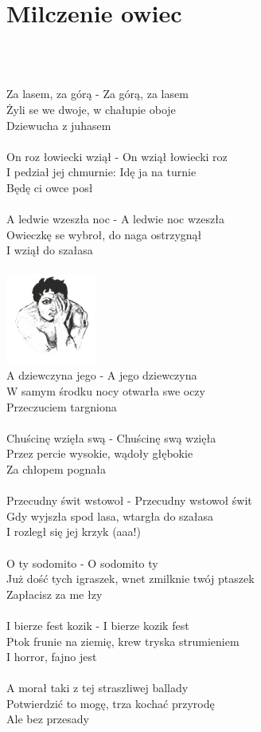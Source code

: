 \documentclass[a5paper, 10pt]{book}
\begin{document}
\newpage
\section{Milczenie owiec}\textcolor{lightgray}{\textit{}}\\~\\
\begin{minipage}[t]{0.8\textwidth}
Za lasem, za górą - Za górą, za lasem\\
Żyli se we dwoje, w chałupie oboje\\
Dziewucha z juhasem\\
\\
On roz łowiecki wziął - On wziął łowiecki roz\\
I pedział jej chmurnie: Idę ja na turnie\\
Będę ci owce posł\\
\\
A ledwie wzeszła noc - A ledwie noc wzeszła\\
Owieczkę se wybroł, do naga ostrzygnął\\
I wziął do szałasa\\
\\
\includegraphics[height=3cm, right]{images/milczenie_owiec.png}\vspace*{-3.05cm}\\
A dziewczyna jego - A jego dziewczyna\\
W samym środku nocy otwarła swe oczy\\
Przeczuciem targniona\\
\\
Chuścinę wzięła swą - Chuścinę swą wzięła\\
Przez percie wysokie, wądoły głębokie\\
Za chłopem pognała\\
\\
Przecudny świt wstowoł - Przecudny wstowoł świt\\
Gdy wyjszła spod lasa, wtargła do szałasa\\
I rozległ się jej krzyk (aaa!)\\
\\
O ty sodomito - O sodomito ty\\
Już dość tych igraszek, wnet zmilknie twój ptaszek\\
Zapłacisz za me łzy\\
\\
I bierze fest kozik - I bierze kozik fest\\
Ptok frunie na ziemię, krew tryska strumieniem\\
I horror, fajno jest\\
\\
A morał taki z tej straszliwej ballady\\
Potwierdzić to mogę, trza kochać przyrodę\\
Ale bez przesady\\
\end{minipage}
\end{document}
